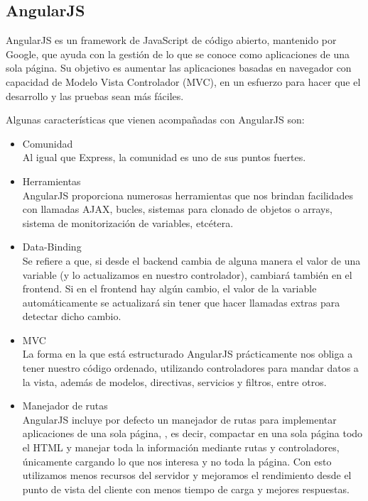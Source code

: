 \subsection{AngularJS}
\label{angularJS}
AngularJS es un framework de JavaScript de código abierto, mantenido por Google, que ayuda con la gestión de lo que se conoce como aplicaciones de una sola página. Su objetivo es aumentar las aplicaciones basadas en navegador con capacidad de Modelo Vista Controlador (MVC), en un esfuerzo para hacer que el desarrollo y las pruebas sean más fáciles.

Algunas características que vienen acompañadas con AngularJS son:

\begin{itemize}
\item Comunidad \\ Al igual que Express, la comunidad es uno de sus puntos fuertes.
\item Herramientas \\  AngularJS proporciona numerosas herramientas que nos brindan facilidades con llamadas \ac{AJAX}, bucles, sistemas para clonado de objetos o arrays, sistema de monitorización de variables, etcétera.
\item Data-Binding \\ Se refiere a que, si desde el backend cambia de alguna manera el valor de una variable (y lo actualizamos en nuestro controlador), cambiará también en el frontend. Si en el frontend hay algún cambio, el valor de la variable automáticamente se actualizará sin tener que hacer llamadas extras para detectar dicho cambio. 
\item MVC \\ La forma en la que está estructurado AngularJS prácticamente nos obliga a tener nuestro código ordenado, utilizando controladores para mandar datos a la vista, además de modelos, directivas, servicios y filtros, entre otros.
\item Manejador de rutas \\ AngularJS incluye por defecto un manejador de rutas para implementar aplicaciones de una sola página, , es decir, compactar en una sola página todo el HTML y manejar toda la información mediante rutas y controladores, únicamente cargando lo que nos interesa y no toda la página. Con esto utilizamos menos recursos del servidor  y mejoramos el rendimiento desde el punto de vista del cliente con menos tiempo de carga y mejores respuestas.
\end{itemize}

